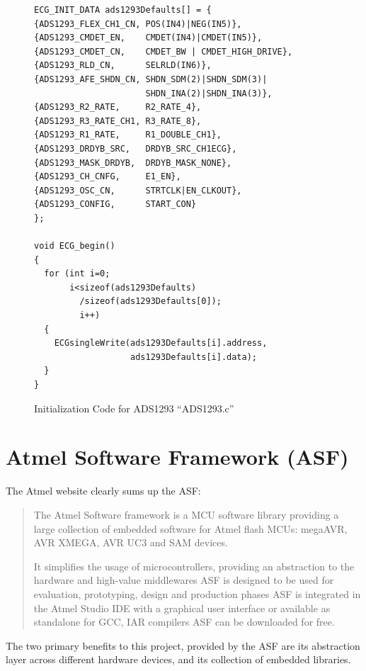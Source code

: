 \begin{figure}
	\begin{center}
		\label{fig:ADS1293_INIT}
\begin{lstlisting}[frame=single,morekeywords={ECG_INIT_DATA}]
ECG_INIT_DATA ads1293Defaults[] = {
{ADS1293_FLEX_CH1_CN, POS(IN4)|NEG(IN5)}, 
{ADS1293_CMDET_EN,    CMDET(IN4)|CMDET(IN5)},
{ADS1293_CMDET_CN,    CMDET_BW | CMDET_HIGH_DRIVE},
{ADS1293_RLD_CN,      SELRLD(IN6)},
{ADS1293_AFE_SHDN_CN, SHDN_SDM(2)|SHDN_SDM(3)|
                      SHDN_INA(2)|SHDN_INA(3)},
{ADS1293_R2_RATE,     R2_RATE_4},
{ADS1293_R3_RATE_CH1, R3_RATE_8},
{ADS1293_R1_RATE,     R1_DOUBLE_CH1},
{ADS1293_DRDYB_SRC,   DRDYB_SRC_CH1ECG},
{ADS1293_MASK_DRDYB,  DRDYB_MASK_NONE},
{ADS1293_CH_CNFG,     E1_EN},
{ADS1293_OSC_CN,      STRTCLK|EN_CLKOUT},
{ADS1293_CONFIG,      START_CON}
};

void ECG_begin()
{
  for (int i=0;
       i<sizeof(ads1293Defaults)
         /sizeof(ads1293Defaults[0]);
         i++)
  {
    ECGsingleWrite(ads1293Defaults[i].address,
                   ads1293Defaults[i].data);
  }
}
\end{lstlisting}
		\caption{Initialization Code for ADS1293 ``ADS1293.c''}
	\end{center}
\end{figure}



\section{Atmel Software Framework (ASF)}
The Atmel website clearly sums up the ASF:

\begin{quotation}
The Atmel Software framework is a MCU software library providing a large collection of embedded software for Atmel flash MCUs: megaAVR, AVR XMEGA, AVR UC3 and SAM devices.

It  simplifies the usage of microcontrollers, providing an abstraction to the hardware and high-value middlewares
ASF is designed to be used for evaluation, prototyping, design and production phases
ASF is integrated in the Atmel Studio IDE with a graphical user interface or available as standalone for GCC, IAR compilers
ASF can be downloaded for free. \cite{AtmelStudio}
\end{quotation} 

The two primary benefits to this project, provided by the ASF are its abstraction layer across different hardware devices, and its collection of embedded libraries.

